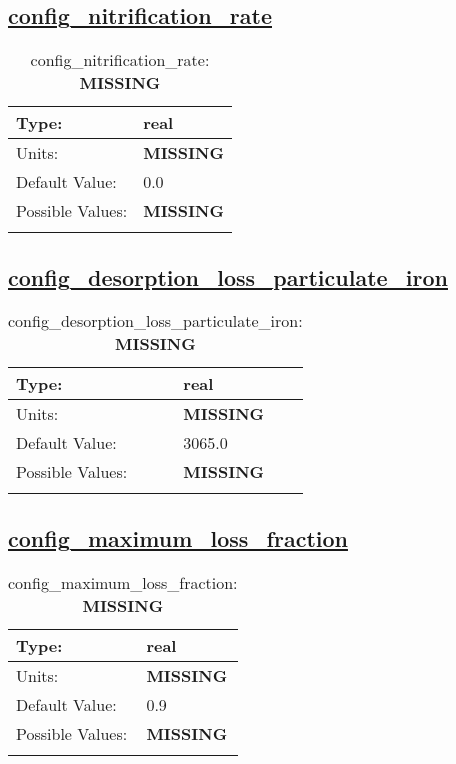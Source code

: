 \subsection[config\_nitrification\_rate]{\hyperref[sec:nm_tab_biogeochemistry]{config\_nitrification\_rate}}
\label{subsec:nm_sec_config_nitrification_rate}
\begin{center}
\begin{longtable}{| p{2.0in} || p{4.0in} |}
    \hline
    Type: & real \\
    \hline
    Units: & {\bf \color{red} MISSING} \\
    \hline
    Default Value: & 0.0 \\
    \hline
    Possible Values: & {\bf \color{red} MISSING} \\
    \hline
    \caption{config\_nitrification\_rate: {\bf \color{red} MISSING}}
\end{longtable}
\end{center}
\subsection[config\_desorption\_loss\_particulate\_iron]{\hyperref[sec:nm_tab_biogeochemistry]{config\_desorption\_loss\_particulate\_iron}}
\label{subsec:nm_sec_config_desorption_loss_particulate_iron}
\begin{center}
\begin{longtable}{| p{2.0in} || p{4.0in} |}
    \hline
    Type: & real \\
    \hline
    Units: & {\bf \color{red} MISSING} \\
    \hline
    Default Value: & 3065.0 \\
    \hline
    Possible Values: & {\bf \color{red} MISSING} \\
    \hline
    \caption{config\_desorption\_loss\_particulate\_iron: {\bf \color{red} MISSING}}
\end{longtable}
\end{center}
\subsection[config\_maximum\_loss\_fraction]{\hyperref[sec:nm_tab_biogeochemistry]{config\_maximum\_loss\_fraction}}
\label{subsec:nm_sec_config_maximum_loss_fraction}
\begin{center}
\begin{longtable}{| p{2.0in} || p{4.0in} |}
    \hline
    Type: & real \\
    \hline
    Units: & {\bf \color{red} MISSING} \\
    \hline
    Default Value: & 0.9 \\
    \hline
    Possible Values: & {\bf \color{red} MISSING} \\
    \hline
    \caption{config\_maximum\_loss\_fraction: {\bf \color{red} MISSING}}
\end{longtable}
\end{center}

